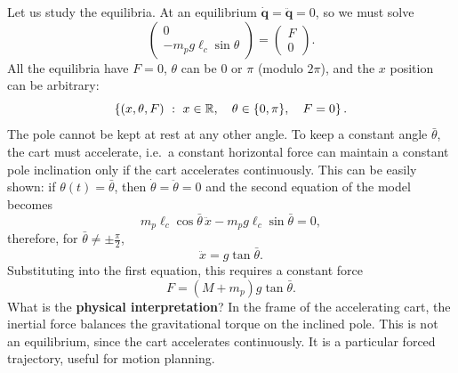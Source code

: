 \documentclass[10pt, a4paper]{report}
\begin{document}
Let us study the equilibria. At an equilibrium $\dot{\mathbf q}=\ddot{\mathbf q}=0$, so we must solve
\begin{equation}
    \begin{pmatrix}
        0\\ -m_pg\ell_c\sin\theta
    \end{pmatrix}=\begin{pmatrix}
        F\\ 0
    \end{pmatrix}.
\end{equation}
All the equilibria have $F=0$, $\theta$ can be $0$ or $\pi$ (modulo $2\pi$), and the $x$ position can be arbitrary:
\begin{equation}
    \left\{(x,\theta,F) \ : \ x\in {\mathbb R},\quad \theta\in\{0,\pi\},\quad F=0\right\}.
\end{equation}
The pole cannot be kept at rest at any other angle. To keep a constant angle $\bar\theta$, the cart must accelerate, i.e.\ a constant horizontal force can maintain a constant pole inclination only if the cart accelerates continuously. This can be easily shown: if $\theta(t)=\bar\theta$, then $\dot\theta=\ddot\theta=0$ and the second equation of the model becomes
\begin{equation}
    m_p \ell_c \cos \bar{\theta} \, \ddot{x} - m_p g \ell_c \sin \bar{\theta} = 0,
\end{equation}
therefore, for $\bar\theta\ne\pm\frac{\pi}{2}$,
\begin{equation}
    \ddot x = g\tan\bar\theta.
\end{equation}
Substituting into the first equation, this requires a constant force
\begin{equation}
    F=(M+m_p)g\tan\bar\theta.
\end{equation}
What is the \textbf{physical interpretation}? In the frame of the accelerating cart, the inertial force balances the gravitational torque on the inclined pole.
This is not an equilibrium, since the cart accelerates continuously. It is a
particular forced trajectory, useful for motion planning.
\end{document}

